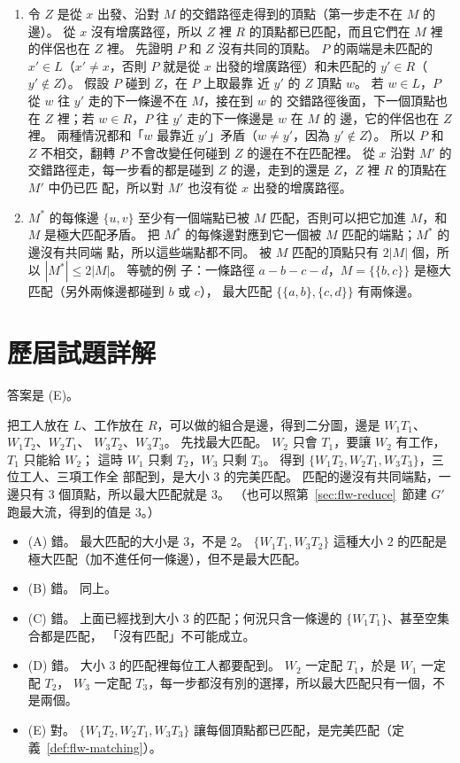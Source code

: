 \begin{enumerate}
\item 令 $Z$ 是從 $x$ 出發、沿對 $M$ 的交錯路徑走得到的頂點（第一步走不在 $M$ 的邊）。 從 $x$
沒有增廣路徑，所以 $Z$ 裡 $R$ 的頂點都已匹配，而且它們在 $M$ 裡的伴侶也在 $Z$ 裡。 先證明
$P$ 和 $Z$ 沒有共同的頂點。 $P$ 的兩端是未匹配的 $x' \in L$（$x' \ne x$，否則 $P$ 就是從 $x$
出發的增廣路徑）和未匹配的 $y' \in R$（$y' \notin Z$）。 假設 $P$ 碰到 $Z$，在 $P$ 上取最靠
近 $y'$ 的 $Z$ 頂點 $w$。 若 $w \in L$，$P$ 從 $w$ 往 $y'$ 走的下一條邊不在 $M$，接在到 $w$ 的
交錯路徑後面，下一個頂點也在 $Z$ 裡；若 $w \in R$，$P$ 往 $y'$ 走的下一條邊是 $w$ 在 $M$ 的
邊，它的伴侶也在 $Z$ 裡。 兩種情況都和「$w$ 最靠近 $y'$」矛盾（$w \ne y'$，因為 $y' \notin Z$）。
所以 $P$ 和 $Z$ 不相交，翻轉 $P$ 不會改變任何碰到 $Z$ 的邊在不在匹配裡。 從 $x$ 沿對 $M'$ 的
交錯路徑走，每一步看的都是碰到 $Z$ 的邊，走到的還是 $Z$，$Z$ 裡 $R$ 的頂點在 $M'$ 中仍已匹
配，所以對 $M'$ 也沒有從 $x$ 出發的增廣路徑。

\item $M^{*}$ 的每條邊 $\{u, v\}$ 至少有一個端點已被 $M$ 匹配，否則可以把它加進 $M$，和 $M$
是極大匹配矛盾。 把 $M^{*}$ 的每條邊對應到它一個被 $M$ 匹配的端點；$M^{*}$ 的邊沒有共同端
點，所以這些端點都不同。 被 $M$ 匹配的頂點只有 $2|M|$ 個，所以 $|M^{*}| \le 2|M|$。 等號的例
子：一條路徑 $a - b - c - d$，$M = \{\{b, c\}\}$ 是極大匹配（另外兩條邊都碰到 $b$ 或 $c$），
最大匹配 $\{\{a, b\}, \{c, d\}\}$ 有兩條邊。
\end{enumerate}

\section*{歷屆試題詳解}

答案是 (E)。

把工人放在 $L$、工作放在 $R$，可以做的組合是邊，得到二分圖，邊是 $W_1T_1$、$W_1T_2$、$W_2T_1$、
$W_3T_2$、$W_3T_3$。 先找最大匹配。 $W_2$ 只會 $T_1$，要讓 $W_2$ 有工作，$T_1$ 只能給 $W_2$；
這時 $W_1$ 只剩 $T_2$，$W_3$ 只剩 $T_3$。 得到 $\{W_1T_2, W_2T_1, W_3T_3\}$，三位工人、三項工作全
部配到，是大小 $3$ 的完美匹配。 匹配的邊沒有共同端點，一邊只有 $3$ 個頂點，所以最大匹配就是 $3$。
（也可以照第~\ref{sec:flw-reduce}~節建 $G'$ 跑最大流，得到的值是 $3$。）

\begin{itemize}
\item (A) 錯。 最大匹配的大小是 $3$，不是 $2$。 $\{W_1T_1, W_3T_2\}$ 這種大小 $2$ 的匹配是
極大匹配（加不進任何一條邊），但不是最大匹配。
\item (B) 錯。 同上。
\item (C) 錯。 上面已經找到大小 $3$ 的匹配；何況只含一條邊的 $\{W_1T_1\}$、甚至空集合都是匹配，
「沒有匹配」不可能成立。
\item (D) 錯。 大小 $3$ 的匹配裡每位工人都要配到。 $W_2$ 一定配 $T_1$，於是 $W_1$ 一定配 $T_2$，
$W_3$ 一定配 $T_3$，每一步都沒有別的選擇，所以最大匹配只有一個，不是兩個。
\item (E) 對。 $\{W_1T_2, W_2T_1, W_3T_3\}$ 讓每個頂點都已匹配，是完美匹配（定義~\ref{def:flw-matching}）。
\end{itemize}

